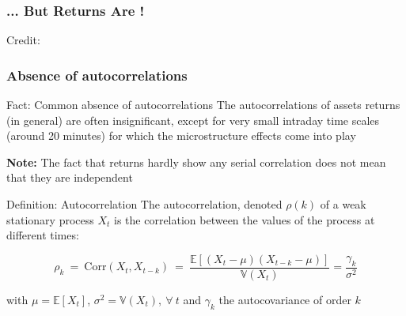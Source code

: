 \documentclass{beamer}
\begin{document}
\begin{frame}
\frametitle{... But Returns Are !}
\hspace*{15pt}\hbox{\scriptsize Credit:}
\end{frame}


\begin{frame}
  \frametitle{Absence of autocorrelations}
  \begin{exampleblock}{Fact: Common absence of autocorrelations}
    The autocorrelations of assets returns (in general) are often insignificant, except for very small intraday time scales (around 20 minutes) for which the microstructure effects come into play
  \end{exampleblock}

\textbf{Note:} The fact that returns hardly show any serial correlation does not mean that they are independent


\begin{block}{Definition: Autocorrelation}
  The autocorrelation, denoted $\rho(k)$ of a weak stationary process $X_t$ is the correlation between the values of the process at different times:

  \begin{equation*}
    \rho_k \ = \ \text{Corr}(X_t, X_{t-k}) \ = \ \frac{\mathbb{E}\left[ (X_t - \mu)(X_{t-k} - \mu)\right]}{\mathbb{V}(X_t)} = \frac{\gamma_k}{\sigma^2}
  \end{equation*}

with $\mu = \mathbb{E}[X_t]$, $\sigma^2 = \mathbb{V}(X_t), \ \forall \ t$ and $\gamma_k$ the autocovariance of order $k$
  
\end{block}

\end{frame}
\end{document}
